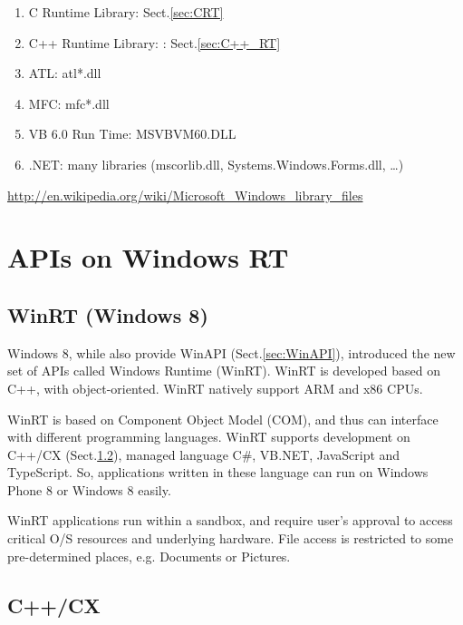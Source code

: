 \begin{enumerate}
  \item C Runtime Library: Sect.\ref{sec:CRT}
  \item C++ Runtime Library: : Sect.\ref{sec:C++_RT}
  \item ATL: atl*.dll
  \item MFC: mfc*.dll
  \item VB 6.0 Run Time: MSVBVM60.DLL
  \item .NET: many libraries (mscorlib.dll, Systems.Windows.Forms.dll, \ldots)
\end{enumerate}

\url{http://en.wikipedia.org/wiki/Microsoft_Windows_library_files}


\section{APIs on Windows RT}
\label{sec:WindowsAPI_Windows-RT}
\subsection{WinRT (Windows 8)}
\label{sec:WinRT}

Windows 8, while also provide WinAPI (Sect.\ref{sec:WinAPI}), introduced the
new set of APIs called Windows Runtime (WinRT). WinRT is developed based on
C++, with object-oriented.
WinRT natively support ARM and x86 CPUs.

WinRT is based on Component Object Model (COM), and thus can interface with
different programming languages. WinRT supports development on C++/CX
(Sect.\ref{sec:C++/CX}), managed language C\#, VB.NET, JavaScript and
TypeScript. So, applications written in these language can run on Windows Phone
8 or Windows 8 easily.

WinRT applications run within a sandbox, and require user's approval to access
critical O/S resources and underlying hardware. File access is restricted to
some pre-determined places, e.g. Documents or Pictures.
\subsection{C++/CX}
\label{sec:C++/CX}

